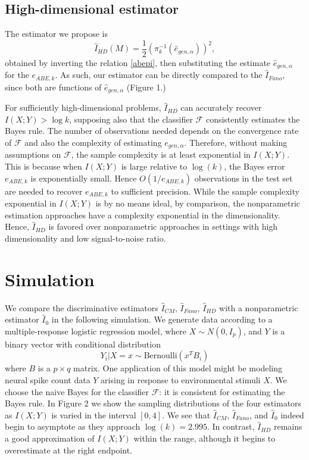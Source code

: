 \documentclass{article}
\begin{document}
\subsection{High-dimensional estimator}

The estimator we propose is
\[
\hat{I}_{HD}(M) = \frac{1}{2}(\pi_{k}^{-1}(\hat{e}_{gen, \alpha}))^2,
\]
obtained by inverting the relation \eqref{abepi}, then substituting the estimate $\hat{e}_{gen, \alpha}$ for the $e_{ABE, k}$.
As such, our estimator can be directly compared to the $\hat{I}_{Fano}$, since both are functions of $\hat{e}_{gen,\alpha}$ (Figure 1.)  

For sufficiently high-dimensional problems, $\hat{I}_{HD}$ can accurately recover $I(X; Y) > \log k$,
supposing also that the classifier $\mathcal{F}$ consistently estimates the Bayes rule.
The number of observations needed depends on the convergence rate of $\mathcal{F}$
and also the complexity of estimating $e_{gen, \alpha}$.  Therefore, without making assumptions on $\mathcal{F}$, the sample complexity is at least exponential in $I(X; Y)$.
This is because when $I(X; Y)$ is large relative to $\log(k)$, the Bayes error $e_{ABE, k}$ is exponentially small.  Hence $O(1/e_{ABE, k})$ observations in the test set are needed to recover $e_{ABE, k}$ to sufficient precision.  While the sample complexity exponential in $I(X; Y)$ is by no means ideal,
by comparison, the nonparametric estimation approaches have a complexity exponential in the dimensionality.  Hence, $\hat{I}_{HD}$ is favored over nonparametric approaches in settings
with high dimensionality and low signal-to-noise ratio.


\section{Simulation}

We compare the discriminative estimators $\hat{I}_{CM}$, $\hat{I}_{Fano}$, $\hat{I}_{HD}$
with a nonparametric estimator $\hat{I}_0$ in the following simulation.
We generate data according to a multiple-response logistic regression model, 
where
$
X \sim N(0, I_p)
$,
and $Y$ is a binary vector with conditional distribution
\[
Y_i|X = x \sim \text{Bernoulli}(x^T B_i)
\]
where $B$ is a $p \times q$ matrix.
One application of this model might be modeling neural spike count data $Y$ arising in response
to environmental stimuli $X$.
We choose the naive Bayes for the classifier $\mathcal{F}$: it is consistent for estimating the Bayes rule.
In Figure 2 we show the sampling distributions of the four estimators as $I(X; Y)$ is varied in the interval $[0, 4]$.  We see that $\hat{I}_{CM}$, $\hat{I}_{Fano}$, and $\hat{I}_0$ indeed begin to asymptote as they approach $\log(k) = 2.995$.  In contrast, $\hat{I}_{HD}$ remains a good approximation of $I(X; Y)$ within the range, although it begins to overestimate at the right endpoint.
\end{document}
